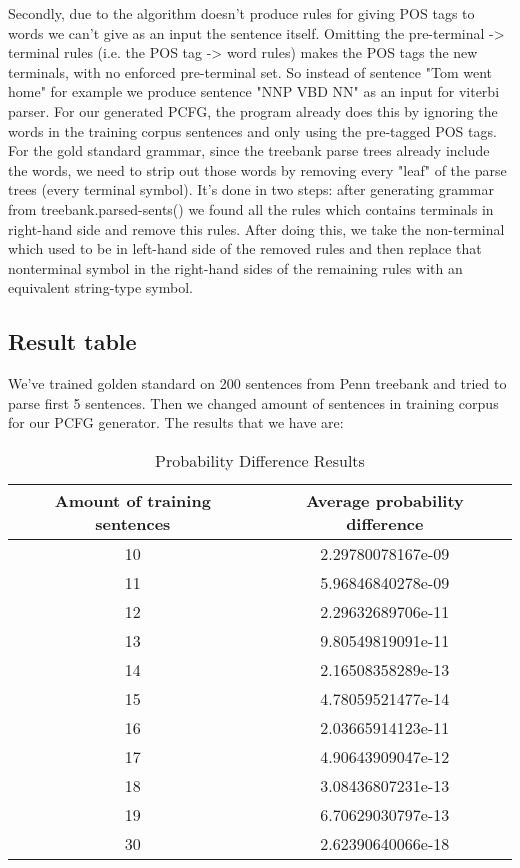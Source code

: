 \documentclass[paper=a4, fontsize=11pt]{scrartcl} %
\numberwithin{equation}{section} %
\numberwithin{figure}{section} %
\numberwithin{table}{section} %
\begin{document}
Secondly, due to the algorithm doesn't produce rules for giving POS tags to words we can't give as an input the sentence itself. Omitting the pre-terminal -> terminal rules (i.e. the POS tag -> word rules) makes the POS tags the new terminals, with no enforced pre-terminal set. So instead of sentence "Tom went home" for example we produce sentence "NNP VBD NN" as an input for viterbi parser.
For our generated PCFG, the program already does this by ignoring the words in the training corpus sentences and only using the pre-tagged POS tags. 
For the gold standard grammar, since the treebank parse trees already include the words, we need to strip out those words by removing every "leaf" of the parse trees (every terminal symbol). It's done in two steps: after generating grammar from treebank.parsed-sents() we found all the rules which contains terminals in right-hand side and remove this rules. After doing this, we take the non-terminal which used to be in left-hand side of the removed rules and  then replace that nonterminal symbol in the right-hand sides of the remaining rules with an equivalent string-type symbol.

\subsection{Result table}

We've trained golden standard on 200 sentences from Penn treebank and tried to parse first 5 sentences. Then we changed amount of sentences in training corpus for our PCFG generator. The results that we have are:

\begin{table}[ht]
\caption{Probability Difference Results}
\centering
\begin{tabular}{c c}
\hline\hline
Amount of training sentences & Average probability difference \\ [0.5ex]
\hline
10&2.29780078167e-09 \\
11&5.96846840278e-09 \\
12&2.29632689706e-11 \\
13&9.80549819091e-11 \\
14& 2.16508358289e-13 \\
15&4.78059521477e-14 \\
16&2.03665914123e-11 \\
17&4.90643909047e-12 \\
18&3.08436807231e-13 \\
19&6.70629030797e-13 \\
30&2.62390640066e-18 \\ [1ex]
\hline
\end{tabular}
\label{table:nonlin}
\end{table}
\end{document}

